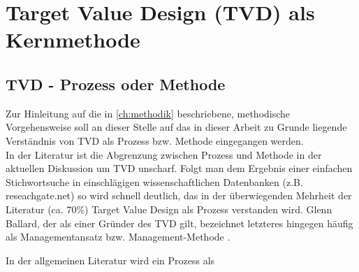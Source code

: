 \clearpage

\section{Target Value Design (TVD) als Kernmethode}
\label{sec: 2.3}


\subsection{TVD - Prozess oder Methode}
\label{sec: 2.3.1}

%
%
%
%
%
%

Zur Hinleitung auf die in \cref{ch:methodik} beschriebene, methodische Vorgehensweise soll an dieser Stelle auf das in dieser Arbeit zu Grunde liegende Verständnis von \ac{TVD} als Prozess bzw. Methode eingegangen werden.\\
In der Literatur ist die Abgrenzung zwischen Prozess und Methode in der aktuellen Diskussion um TVD unscharf. Folgt man dem Ergebnis einer einfachen Stichwortsuche in einschlägigen wissenschaftlichen Datenbanken (z.B. reseachgate.net) so wird schnell deutlich, das in der überwiegenden Mehrheit der Literatur (ca. 70\%) Target Value Design als Prozess verstanden wird.
Glenn Ballard, der als einer Gründer des \ac{TVD} gilt, bezeichnet letzteres hingegen häufig als Managementansatz bzw. Management-Methode \autocite[]{}.

In der allgemeinen Literatur wird ein Prozess als 